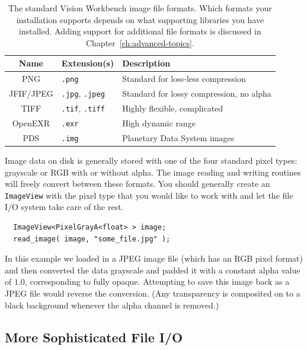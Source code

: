 \begin{table}[t]\begin{centering}
\begin{tabular}{|c|l|l|} \hline
Name & Extension(s) & Description \\ \hline \hline
PNG & \verb#.png# & Standard for loss-less compression \\ \hline
JFIF/JPEG & \verb#.jpg#, \verb#.jpeg# & Standard for lossy compression, no alpha \\ \hline
TIFF & \verb#.tif#, \verb#.tiff# & Highly flexible, complicated \\ \hline
OpenEXR & \verb#.exr# & High dynamic range \\ \hline
PDS & \verb#.img# & Planetary Data System images \\ \hline
\end{tabular}
\caption{The standard Vision Workbench image file formats.  Which formats
your installation supports depends on what supporting libraries you have
installed.  Adding support for additional file formats is discussed in
Chapter~\ref{ch:advanced-topics}.}
\label{tbl:file-formats}
\end{centering}\end{table}

Image data on disk is generally stored with one of the four standard
pixel types: grayscale or RGB with or without alpha.  The image
reading and writing routines will freely convert between these
formats.  You should generally create an \verb#ImageView# with the
pixel type that you would like to work with and let the file I/O
system take care of the rest.
\begin{verbatim}
  ImageView<PixelGrayA<float> > image;
  read_image( image, "some_file.jpg" );
\end{verbatim}
In this example we loaded in a JPEG image file (which has an RGB pixel
format) and then converted the data grayscale and padded it with a
constant alpha value of $1.0$, corresponding to fully opaque.
Attempting to save this image back as a JPEG file would reverse the
conversion.  (Any transparency is composited on to a black background
whenever the alpha channel is removed.)

\subsection{More Sophisticated File I/O}

